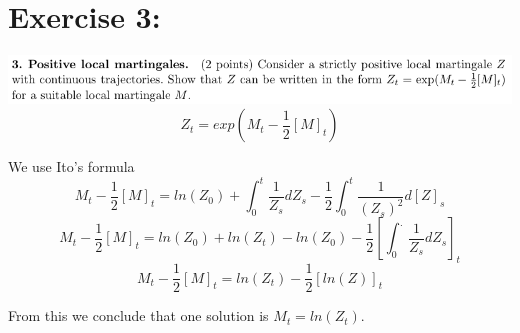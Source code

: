 \documentclass[document.tex]{subfiles}
\begin{document}
\section*{Exercise 3:}

\includegraphics[width=\textwidth]{ex3.png}
\begin{equation}
Z_t = exp(M_t - \frac{1}{2} [M]_t)
\end{equation}

We use Ito's formula
\begin{equation}
M_t - \frac{1}{2} [M]_t = ln(Z_0) + \int_0^t \frac{1}{Z_s} d Z_s - \frac{1}{2} \int_0^t \frac{1}{(Z_s)^2} d [Z]_s
\end{equation}
\begin{equation}
M_t - \frac{1}{2} [M]_t = ln(Z_0) + ln(Z_t) - ln(Z_0) - \frac{1}{2} [\int_0^. \frac{1}{Z_s} d Z_s]_t
\end{equation}
\begin{equation}
M_t - \frac{1}{2} [M]_t = ln(Z_t) - \frac{1}{2} [ln(Z)]_t
\end{equation}

From this we conclude that one solution is $M_t = ln(Z_t)$.
\end{document}
